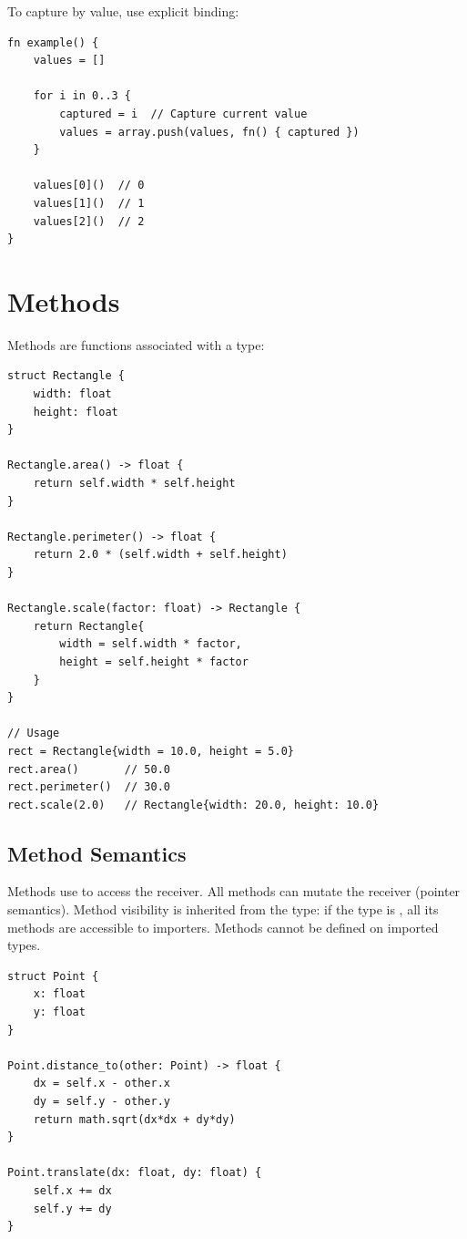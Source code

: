 To capture by value, use explicit binding:

\begin{lstlisting}
fn example() {
    values = []

    for i in 0..3 {
        captured = i  // Capture current value
        values = array.push(values, fn() { captured })
    }

    values[0]()  // 0
    values[1]()  // 1
    values[2]()  // 2
}
\end{lstlisting}

\section{Methods}

Methods are functions associated with a type:

\begin{lstlisting}
struct Rectangle {
    width: float
    height: float
}

Rectangle.area() -> float {
    return self.width * self.height
}

Rectangle.perimeter() -> float {
    return 2.0 * (self.width + self.height)
}

Rectangle.scale(factor: float) -> Rectangle {
    return Rectangle{
        width = self.width * factor,
        height = self.height * factor
    }
}

// Usage
rect = Rectangle{width = 10.0, height = 5.0}
rect.area()       // 50.0
rect.perimeter()  // 30.0
rect.scale(2.0)   // Rectangle{width: 20.0, height: 10.0}
\end{lstlisting}

\subsection{Method Semantics}

Methods use  to access the receiver. All methods can mutate the receiver (pointer semantics). Method visibility is inherited from the type: if the type is , all its methods are accessible to importers. Methods cannot be defined on imported types.

\begin{lstlisting}
struct Point {
    x: float
    y: float
}

Point.distance_to(other: Point) -> float {
    dx = self.x - other.x
    dy = self.y - other.y
    return math.sqrt(dx*dx + dy*dy)
}

Point.translate(dx: float, dy: float) {
    self.x += dx
    self.y += dy
}
\end{lstlisting}

